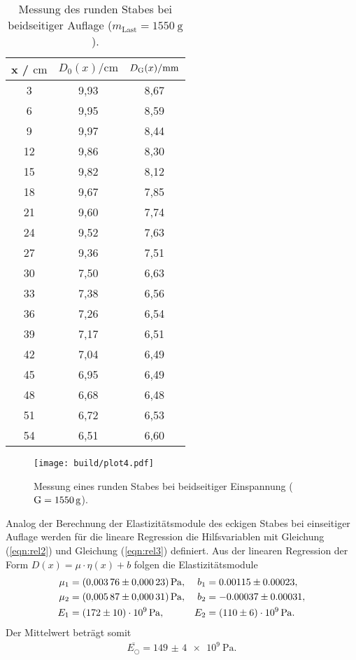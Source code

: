 \sloppy
\begin{table}[H]
  \centering
  \caption{Messung des runden Stabes bei beidseitiger Auflage ($m_{\text{Last}} = \SI{1550}{\gram}$).}
  \label{tab:werte4}
  \begin{tabular}{c c c}
    \toprule
    x / $\si{\centi\meter} $ & $ D_0(x) / \si{\centi\meter}$ & $D_{\text G}(x) / \si{\milli\meter}$ \\
    \midrule
    3 & 9,93 & 8,67 \\
    6 & 9,95 & 8,59 \\
    9 & 9,97 & 8,44 \\
    12 & 9,86 & 8,30 \\
    15 & 9,82 & 8,12 \\
    18 & 9,67 & 7,85 \\
    21 & 9,60 & 7,74 \\
    24 & 9,52 & 7,63 \\
    27 & 9,36 & 7,51 \\
    30 & 7,50 & 6,63 \\
    33 & 7,38 & 6,56 \\
    36 & 7,26 & 6,54 \\
    39 & 7,17 & 6,51 \\
    42 & 7,04 & 6,49 \\
    45 & 6,95 & 6,49 \\
    48 & 6,68 & 6,48 \\
    51 & 6,72 & 6,53 \\
    54 & 6,51 & 6,60 \\
    \bottomrule
  \end{tabular}
\end{table}

\sloppy
\begin{figure}[H]
  \centering
  \texttt{[image: build/plot4.pdf]}
  \caption{Messung eines runden Stabes bei beidseitiger Einspannung ($\text G = \SI{1550}{\gram}$).}
  \label{fig:plot4}
\end{figure}


Analog der Berechnung der Elastizitätsmodule des eckigen Stabes bei einseitiger Auflage werden für die lineare Regression die 
Hilfsvariablen mit Gleichung (\ref{eqn:rel2}) und Gleichung (\ref{eqn:rel3}) definiert. Aus der linearen Regression der Form $D(x) = \mu\cdot\eta(x)+b$
folgen die Elastizitätsmodule
\begin{align*}
  \mu_1 &= \SI{0.00376 (0.00023)}{\Pa}, & b_1 &= 0.00115 \pm 0.00023, \\
  \mu_2 &= \SI{0.00587 (0.00031)}{\Pa}, & b_2 &= -0.00037 \pm 0.00031, \\
  E_1 &= \SI{172 (10)e9}{\Pa}, & E_2 &= \SI{110 (6)e9}{\Pa}.\\
\end{align*}
Der Mittelwert beträgt somit
\begin{align*}
  \overline{E_{\bigcirc}} = \SI{149(4)e9}{\Pa}.
\end{align*}